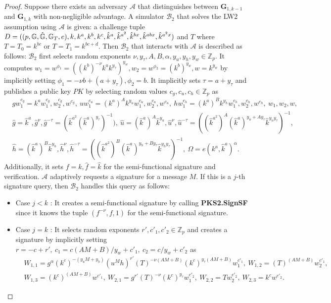 \documentclass[11pt,letterpaper]{article}
\newcommand{\G}{\mathbb{G}}
\newcommand{\Z}{\mathbb{Z}}
\newcommand{\mc}[1]{\mathcal{#1}}
\newcommand{\tb}[1]{\textbf{#1}}
\newcommand{\lb}{\linebreak[0]}
\begin{document}
\begin{proof}
Suppose there exists an adversary $\mc{A}$ that distinguishes between
$\tb{G}_{1,k-1}$ and $\tb{G}_{1,k}$ with non-negligible advantage. A
simulator $\mc{B}_2$ that solves the LW2 assumption using $\mc{A}$ is given:
a challenge tuple
    $D = ((p, \G, \hat{\G}, \G_T, e), \lb
    k, k^a, k^b, k^c, \hat{k}^a, \hat{k}^{a^2}, \hat{k}^{bx}, \hat{k}^{abx},
    \hat{k}^{a^2x})$ and $T$
where $T = T_0 = k^{bc}$ or $T = T_1 = k^{bc+d}$. Then $\mc{B}_2$ that
interacts with $\mc{A}$ is described as follows: $\mc{B}_2$ first selects
random exponents $\nu, y_{\tau}, A, B, \alpha, y_u, y_h, y_w \in \Z_p$. It
computes
    $w_1 = w^{\phi_1} = ((k^b)^{-\nu} k^a k^{y_{\tau}})^{y_w},
    w_2 = w^{\phi_2} = (k^b)^{y_w},
    w = k^{y_w}$
by implicitly setting $\phi_1 = -\nu b + (a + y_{\tau}), \phi_2 = b$. It
implicitly sets $\tau = a + y_{\tau}$ and publishes a public key $PK$ by
selecting random values $c_g, c_u, c_h \in \Z_p$ as
    \begin{align*}
    &   g w_1^{c_g} = k^a w_1^{c_g}, w_2^{c_g}, w^{c_g},~
        u w_1^{c_u} = (k^a)^A k^{y_u} w_1^{c_u}, w_2^{c_u}, w^{c_u},~
        h w_1^{c_h} = (k^a)^B k^{y_h} w_1^{c_h}, w_2^{c_h}, w^{c_h},~
        w_1, w_2, w,~ \\
    &   \hat{g} = \hat{k}^a, \hat{g}^{\nu},
        \hat{g}^{-\tau} = (\hat{k}^{a^2} (\hat{k}^a)^{y_{\tau}})^{-1}),~
        \hat{u} = (\hat{k}^a)^A \hat{k}^{y_u}, \hat{u}^{\nu},
        \hat{u}^{-\tau} = ((\hat{k}^{a^2})^A (\hat{k}^a)^{y_u + Ay_{\tau}}
            \hat{k}^{y_u y_{\tau}})^{-1},~ \\
    &   \hat{h} = (\hat{k}^a)^B \hat{k}^{y_h}, \hat{h}^{\nu},
        \hat{h}^{-\tau} = ((\hat{k}^{a^2})^B (\hat{k}^a)^{y_h + By_{\tau}}
            \hat{k}^{y_h y_{\tau}} )^{-1},~
        \Omega = e(k^a, \hat{k}^a)^{\alpha}.
    \end{align*}
Additionally, it sets $f = k, \hat{f} = \hat{k}$ for the semi-functional
signature and verification. $\mc{A}$ adaptively requests a signature for a
message $M$. If this is a $j$-th signature query, then $\mc{B}_2$ handles
this query as follows:
\begin{itemize}
\item {Case $j < k$} : It creates a semi-functional signature by calling
    \tb{PKS2.SignSF} since it knows the tuple $(f^{-\nu}, f, 1)$ for the
    semi-functional signature.

\item {Case $j = k$} : It selects random exponents $r', c'_1, c'_2 \in
    \Z_p$ and creates a signature by implicitly setting $r = -c + r',~
    c_1 = c(AM+B)/y_w + c'_1,~ c_2 = c/y_w + c'_2$ as
    \begin{align*}
    &   W_{1,1} = g^{\alpha} (k^c)^{-(y_u M + y_h)} (u^M h)^{r'}
                  (T)^{-\nu (AM+B)} (k^c)^{y_{\tau} (AM+B)} w_1^{c'_1} ,~
        W_{1,2} = (T)^{(AM+B)} w_2^{c'_1},~ \\
    &   W_{1,3} = (k^c)^{(AM+B)} w^{c'_1},~
        W_{2,1} = g^{r'} (T)^{-\nu} (k^c)^{y_{\tau}} w_1^{c'_2},~
        W_{2,2} = T w_2^{c'_2},~
        W_{2,3} = k^c w^{c'_2}.
    \end{align*}


\end{itemize}
\end{proof}
\end{document}
